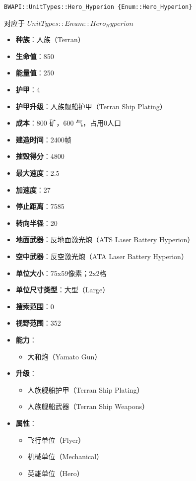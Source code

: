 \begin{tcolorbox}[colback=white, colframe=black!60!white, title=Hero\_Hyperion(), arc=0mm]
    \begin{verbatim}
BWAPI::UnitTypes::Hero_Hyperion {Enum::Hero_Hyperion}
    \end{verbatim}
    对应于  $ UnitTypes::Enum::Hero_Hyperion $ 
    \begin{itemize}
        \item \textbf{种族}：人族（Terran）
        \item \textbf{生命值}：850
        \item \textbf{能量值}：250
        \item \textbf{护甲}：4
        \item \textbf{护甲升级}：人族舰船护甲（Terran Ship Plating）
        \item \textbf{成本}：800 矿，600 气，占用0人口
        \item \textbf{建造时间}：2400帧
        \item \textbf{摧毁得分}：4800
        \item \textbf{最大速度}：2.5
        \item \textbf{加速度}：27
        \item \textbf{停止距离}：7585
        \item \textbf{转向半径}：20
        \item \textbf{地面武器}：反地面激光炮（ATS Laser Battery Hyperion）
        \item \textbf{空中武器}：反空激光炮（ATA Laser Battery Hyperion）
        \item \textbf{单位大小}：75x59像素；2x2格
        \item \textbf{单位尺寸类型}：大型（Large）
        \item \textbf{搜索范围}：0
        \item \textbf{视野范围}：352
        \item \textbf{能力}：
            \begin{itemize}
                \item 大和炮（Yamato Gun）
            \end{itemize}
        \item \textbf{升级}：
            \begin{itemize}
                \item 人族舰船护甲（Terran Ship Plating）
                \item 人族舰船武器（Terran Ship Weapons）
            \end{itemize}
        \item \textbf{属性}：
            \begin{itemize}
                \item 飞行单位（Flyer）
                \item 机械单位（Mechanical）
                \item 英雄单位（Hero）
            \end{itemize}
    \end{itemize}
\end{tcolorbox}


